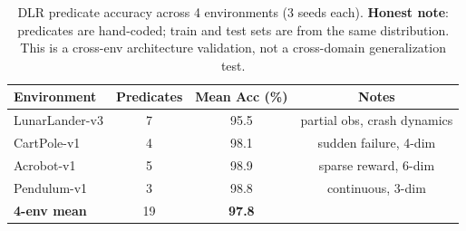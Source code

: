 
\begin{table}[t]
\centering
\caption{DLR predicate accuracy across 4 environments (3 seeds each).
\textbf{Honest note}: predicates are hand-coded; train and test sets are
from the same distribution. This is a cross-env architecture validation,
not a cross-domain generalization test.}
\label{tab:dlr-cross}
\begin{tabular}{lccc}
\hline
\textbf{Environment} & \textbf{Predicates} & \textbf{Mean Acc (\%)} & \textbf{Notes} \\
\hline
LunarLander-v3 & 7 & 95.5 & partial obs, crash dynamics \\
CartPole-v1    & 4 & 98.1 & sudden failure, 4-dim \\
Acrobot-v1     & 5 & 98.9 & sparse reward, 6-dim \\
Pendulum-v1    & 3 & 98.8 & continuous, 3-dim \\
\hline
\textbf{4-env mean} & 19 & \textbf{97.8} & \\
\hline
\end{tabular}
\end{table}
